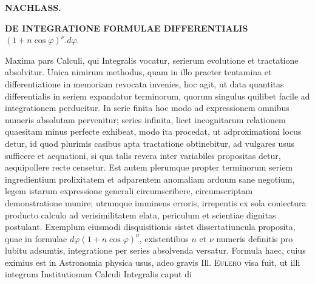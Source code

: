 
\begin{center}
\textbf{NACHLASS.}
\end{center}

\begin{center}
\textbf{DE INTEGRATIONE FORMULAE DIFFERENTIALIS}\\
$(1+n\cos\varphi)^{\nu}. d\varphi.$
\end{center}

\noindent\hspace*{\parindent} Maxima pars Calculi, qui Integralis vocatur, serierum evolutione et
tractatione absolvitur. Unica nimirum methodus, quam in illo praeter tentamina et
differentiatione in memoriam revocata invenies, hoc agit, ut data quantitas differentialis
in seriem expandatur terminorum, quorum singulus quilibet facile ad integrationem
perducitur. In serie finita hoc modo ad expressionem omnibus numeris absolutam
pervenitur; series infinita, licet incognitarum relationem quaesitam minus perfecte
exhibeat, modo ita procedat, ut adproximationi locus detur, id quod plurimis casibus apta
tractatione obtinebitur, ad vulgares usus sufficere et aequationi, si qua talis revera
inter variabiles propositas detur, aequipollere recte censetur. Est autem plerumque
propter terminorum seriem ingredientium prolixitatem et adparentem anomaliam arduum sane
negotium, legem istarum expressione generali circumscribere, circumscriptam
demonstratione munire; utrumque imminens erroris, irrepentis ex sola coniectura producto
calculo ad verisimilitatem elata, periculum et scientiae dignitas postulant. Exemplum
eiusmodi disquisitionis sistet dissertatiuncula proposita, quae in formulae
$d\varphi(1+n\cos\varphi)^{\nu}$, existentibus $n$ et $\nu$ numeris definitis pro lubitu
adsumtis, integratione per series absolvenda versatur. Formula haec, cuius eximius est in
Astronomia physica usus, adeo gravis Ill. \textsc{Eulero} visa fuit, ut illi integrum
Institutionum Calculi Integralis caput di%
